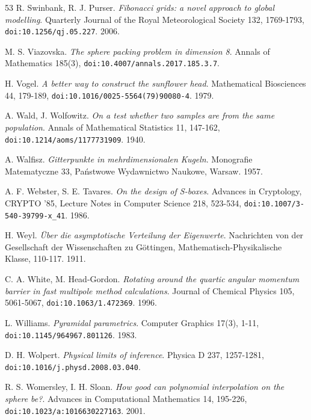 \begin{thebibliography}{53}
R. Swinbank, R. J. Purser. \emph{Fibonacci grids: a novel approach to global modelling}. Quarterly Journal of the Royal Meteorological Society 132, 1769-1793, \texttt{doi:10.1256/\allowbreak{}qj.05.227}. 2006.

M. S. Viazovska. \emph{The sphere packing problem in dimension 8}. Annals of Mathematics 185(3), \texttt{doi:10.4007/\allowbreak{}annals.2017.185.3.7}.

H. Vogel. \emph{A better way to construct the sunflower head}. Mathematical Biosciences 44, 179-189, \texttt{doi:10.1016/\allowbreak{}0025-5564(79)90080-4}. 1979.

A. Wald, J. Wolfowitz. \emph{On a test whether two samples are from the same population}. Annals of Mathematical Statistics 11, 147-162, \texttt{doi:10.1214/\allowbreak{}aoms/\allowbreak{}1177731909}. 1940.

A. Walfisz. \emph{Gitterpunkte in mehrdimensionalen Kugeln}. Monografie Matematyczne 33, Państwowe Wydawnictwo Naukowe, Warsaw. 1957.

A. F. Webster, S. E. Tavares. \emph{On the design of S-boxes}. Advances in Cryptology, CRYPTO '85, Lecture Notes in Computer Science 218, 523-534, \texttt{doi:10.1007/\allowbreak{}3-540-39799-x\_\allowbreak{}41}. 1986.

H. Weyl. \emph{Über die asymptotische Verteilung der Eigenwerte}. Nachrichten von der Gesellschaft der Wissenschaften zu Göttingen, Mathematisch-Physikalische Klasse, 110-117. 1911.

C. A. White, M. Head-Gordon. \emph{Rotating around the quartic angular momentum barrier in fast multipole method calculations}. Journal of Chemical Physics 105, 5061-5067, \texttt{doi:10.1063/\allowbreak{}1.472369}. 1996.

L. Williams. \emph{Pyramidal parametrics}. Computer Graphics 17(3), 1-11, \texttt{doi:10.1145/\allowbreak{}964967.801126}. 1983.

D. H. Wolpert. \emph{Physical limits of inference}. Physica D 237, 1257-1281, \texttt{doi:10.1016/\allowbreak{}j.physd.2008.03.040}.

R. S. Womersley, I. H. Sloan. \emph{How good can polynomial interpolation on the sphere be?}. Advances in Computational Mathematics 14, 195-226, \texttt{doi:10.1023/\allowbreak{}a:1016630227163}. 2001.

\end{thebibliography}
